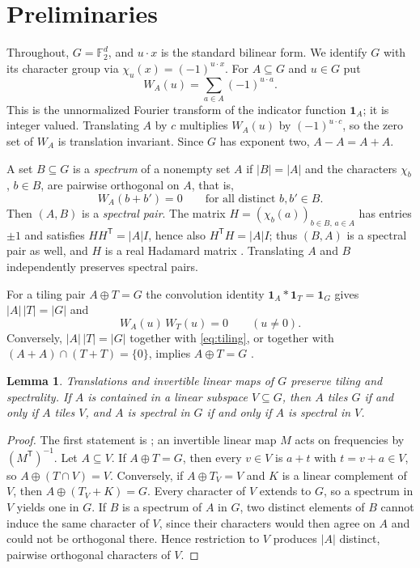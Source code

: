 \documentclass[11pt]{amsart}
\newtheorem{lemma}[theorem]{Lemma}
\theoremstyle{definition}
\theoremstyle{remark}
\numberwithin{equation}{section}
\numberwithin{table}{section}
\newcommand{\F}{\mathbb{F}}
\newcommand{\one}{\mathbf{1}}
\newcommand{\T}{\mathsf{T}}
\begin{document}
\section{Preliminaries}\label{sec:prelim}

Throughout, $G=\F_2^d$, and $u\cdot x$ is the standard bilinear form. We identify $G$ with its character group via $\chi_u(x)=(-1)^{u\cdot x}$. For $A\subseteq G$ and $u\in G$ put
\[
W_A(u)=\sum_{a\in A}(-1)^{u\cdot a}.
\]
This is the unnormalized Fourier transform of the indicator function $\one_A$; it is integer valued. Translating $A$ by $c$ multiplies $W_A(u)$ by $(-1)^{u\cdot c}$, so the zero set of $W_A$ is translation invariant. Since $G$ has exponent two, $A-A=A+A$.

A set $B\subseteq G$ is a \emph{spectrum} of a nonempty set $A$ if $|B|=|A|$ and the characters $\chi_b$, $b\in B$, are pairwise orthogonal on $A$, that is,
\begin{equation}\label{eq:spectral}
W_A(b+b')=0\qquad\text{for all distinct } b,b'\in B .
\end{equation}
Then $(A,B)$ is a \emph{spectral pair}. The matrix $H=(\chi_b(a))_{b\in B,\,a\in A}$ has entries $\pm1$ and satisfies $HH^{\T}=|A|I$, hence also $H^{\T}H=|A|I$; thus $(B,A)$ is a spectral pair as well, and $H$ is a real Hadamard matrix \cite[Theorem~4.1]{AAB17}. Translating $A$ and $B$ independently preserves spectral pairs.

For a tiling pair $A\oplus T=G$ the convolution identity $\one_A*\one_T=\one_G$ gives $|A|\,|T|=|G|$ and
\begin{equation}\label{eq:tiling}
W_A(u)\,W_T(u)=0\qquad(u\ne0).
\end{equation}
Conversely, $|A|\,|T|=|G|$ together with \eqref{eq:tiling}, or together with $(A+A)\cap(T+T)=\{0\}$, implies $A\oplus T=G$ \cite[Theorem~3.1]{AAB17}.

\begin{lemma}\label{lem:affine}
Translations and invertible linear maps of $G$ preserve tiling and spectrality. If $A$ is contained in a linear subspace $V\subseteq G$, then $A$ tiles $G$ if and only if $A$ tiles $V$, and $A$ is spectral in $G$ if and only if $A$ is spectral in $V$.
\end{lemma}

\begin{proof}
The first statement is \cite[Corollaries~3.2 and 4.3]{AAB17}; an invertible linear map $M$ acts on frequencies by $(M^{\T})^{-1}$. Let $A\subseteq V$. If $A\oplus T=G$, then every $v\in V$ is $a+t$ with $t=v+a\in V$, so $A\oplus(T\cap V)=V$. Conversely, if $A\oplus T_V=V$ and $K$ is a linear complement of $V$, then $A\oplus(T_V+K)=G$. Every character of $V$ extends to $G$, so a spectrum in $V$ yields one in $G$. If $B$ is a spectrum of $A$ in $G$, two distinct elements of $B$ cannot induce the same character of $V$, since their characters would then agree on $A$ and could not be orthogonal there. Hence restriction to $V$ produces $|A|$ distinct, pairwise orthogonal characters of $V$.
\end{proof}
\end{document}
